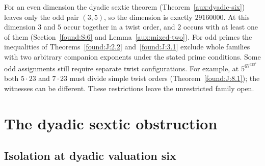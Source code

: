 \documentclass[11pt,a4paper]{article}
\numberwithin{equation}{section}
\theoremstyle{remark}
\begin{document}
For an even dimension the dyadic sextic theorem (Theorem~\ref{aux:dyadic-six}) leaves only the odd pair $(3,5)$, so the dimension is exactly $29160000$. At this dimension $3$ and $5$ occur together in a twist order, and $2$ occurs with at least one of them (Section~\ref{found:S:6} and Lemma~\ref{aux:mixed-two}). For odd primes the inequalities of Theorems~\ref{found:J:2.2} and~\ref{found:J:3.1} exclude whole families with two arbitrary companion exponents under the stated prime conditions. Some odd assignments still require separate twist configurations. For example, at $5^67^623^4$ both $5\cdot23$ and $7\cdot23$ must divide simple twist orders (Theorem~\ref{found:J:8.1}); the witnesses can be different. These restrictions leave the unrestricted family open.

\section{The dyadic sextic obstruction}\label{found:group:dyadic}

\subsection{Isolation at dyadic valuation six}
\end{document}
